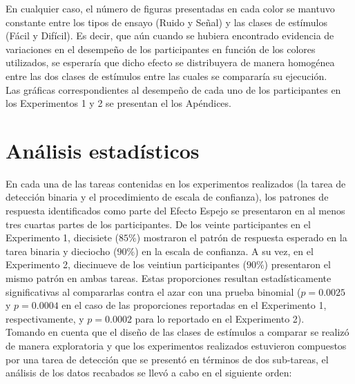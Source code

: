 En cualquier caso, el número de figuras presentadas en cada color se mantuvo constante entre los tipos de ensayo (Ruido y Señal) y las clases de estímulos (Fácil y Difícil). Es decir, que aún cuando se hubiera encontrado evidencia de variaciones en el desempeño de los participantes en función de los colores utilizados, se esperaría que dicho efecto se distribuyera de manera homogénea entre las dos clases de estímulos entre las cuales se compararía su ejecución.\\

Las gráficas correspondientes al desempeño de cada uno de los participantes en los Experimentos 1 y 2 se presentan el los Apéndices.\\
























\section{Análisis estadísticos}

En cada una de las tareas contenidas en los experimentos realizados (la tarea de detección binaria y el procedimiento de escala de confianza), los patrones de respuesta identificados como parte del Efecto Espejo se presentaron en al menos tres cuartas partes de los participantes. De los veinte participantes en el Experimento 1, diecisiete ($85\%$) mostraron el patrón de respuesta esperado en la tarea binaria y dieciocho ($90\%$) en la escala de confianza. A su vez, en el Experimento 2, diecinueve de los veintiun participantes ($90\%$) presentaron el mismo patrón en ambas tareas. Estas proporciones resultan estadísticamente significativas al compararlas contra el azar con una prueba binomial ($p=0.0025$ y $p=0.0004$ en el caso de las proporciones reportadas en el Experimento 1, respectivamente, y $p=0.0002$ para lo reportado en el Experimento 2).\\

Tomando en cuenta que el diseño de las clases de estímulos a comparar se realizó de manera exploratoria y que los experimentos realizados estuvieron compuestos por una tarea de detección que se presentó en términos de dos sub-tareas, el análisis de los datos recabados se llevó a cabo en el siguiente orden:\\

